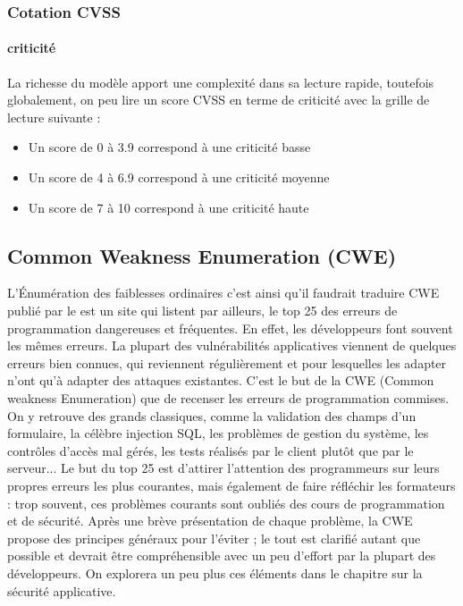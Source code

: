 \begin{frame}
\frametitle<presentation>{Cotation CVSS}
\framesubtitle<presentation>{criticité}
La richesse du modèle apport une complexité dans sa lecture rapide, toutefois globalement, on peu lire un score CVSS en terme de criticité avec la grille de lecture suivante :

\begin{itemize}
  \item Un score de 0 à 3.9 correspond à une criticité basse
  \item Un score de 4 à 6.9 correspond à une criticité moyenne
  \item Un score de 7 à 10 correspond à une criticité haute
\end{itemize}
\end{frame}


\subsection{Common Weakness Enumeration (CWE)}

 L'Énumération des faiblesses ordinaires c'est ainsi qu'il faudrait traduire CWE publié par le   est un site qui listent par ailleurs, le top 25 des  erreurs de programmation dangereuses et fréquentes. 
En effet, les  développeurs font souvent les mêmes erreurs.
La plupart des vulnérabilités applicatives viennent de quelques erreurs bien connues, qui reviennent régulièrement et pour lesquelles les adapter n'ont qu'à adapter des attaques existantes.
C'est le but de la CWE (Common weakness Enumeration) que de recenser les erreurs de programmation commises. 
On y retrouve des grands classiques, comme la validation des champs d'un formulaire, la célèbre injection SQL, les problèmes de gestion du système, les contrôles d'accès mal gérés, les tests réalisés par le client plutôt que par le serveur...
Le but du top 25 est d'attirer l'attention des programmeurs sur leurs propres erreurs les plus courantes, mais également de faire réfléchir les formateurs : trop souvent, ces problèmes courants sont oubliés des cours de programmation et de sécurité. Après une brève présentation de chaque problème, la CWE propose des principes généraux pour l'éviter ; le tout est clarifié autant que possible et devrait être compréhensible avec un peu d'effort par la plupart des développeurs. On explorera un peu plus ces éléments dans le chapitre sur la sécurité applicative.


